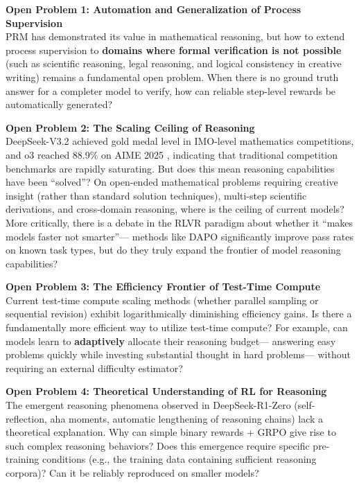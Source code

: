 \begin{openproblembox}
\textbf{Open Problem 1: Automation and Generalization of Process Supervision}\\
PRM has demonstrated its value in mathematical reasoning,
but how to extend process supervision to \textbf{domains where formal verification is not possible}
(such as scientific reasoning, legal reasoning, and logical consistency in creative writing)
remains a fundamental open problem.
When there is no ground truth answer for a completer model to verify,
how can reliable step-level rewards be automatically generated?
\end{openproblembox}

\begin{openproblembox}
\textbf{Open Problem 2: The Scaling Ceiling of Reasoning}\\
DeepSeek-V3.2 \cite{deepseek2025v32} achieved gold medal level in IMO-level mathematics competitions,
and o3 reached 88.9\% on AIME 2025 \cite{openai2025o3},
indicating that traditional competition benchmarks are rapidly saturating.
But does this mean reasoning capabilities have been ``solved''?
On open-ended mathematical problems requiring creative insight (rather than standard solution techniques),
multi-step scientific derivations, and cross-domain reasoning,
where is the ceiling of current models?
More critically, there is a debate in the RLVR paradigm about whether it ``makes models faster not smarter''---
methods like DAPO significantly improve pass rates on known task types,
but do they truly expand the frontier of model reasoning capabilities?
\end{openproblembox}

\begin{openproblembox}
\textbf{Open Problem 3: The Efficiency Frontier of Test-Time Compute}\\
Current test-time compute scaling methods
(whether parallel sampling or sequential revision)
exhibit logarithmically diminishing efficiency gains.
Is there a fundamentally more efficient way to utilize test-time compute?
For example, can models learn to \textbf{adaptively} allocate their reasoning budget---
answering easy problems quickly while investing substantial thought in hard problems---
without requiring an external difficulty estimator?
\end{openproblembox}

\begin{openproblembox}
\textbf{Open Problem 4: Theoretical Understanding of RL for Reasoning}\\
The emergent reasoning phenomena observed in DeepSeek-R1-Zero
(self-reflection, aha moments, automatic lengthening of reasoning chains)
lack a theoretical explanation.
Why can simple binary rewards + GRPO give rise to such complex reasoning behaviors?
Does this emergence require specific pre-training conditions (e.g., the training data containing sufficient reasoning corpora)?
Can it be reliably reproduced on smaller models?
\end{openproblembox}

